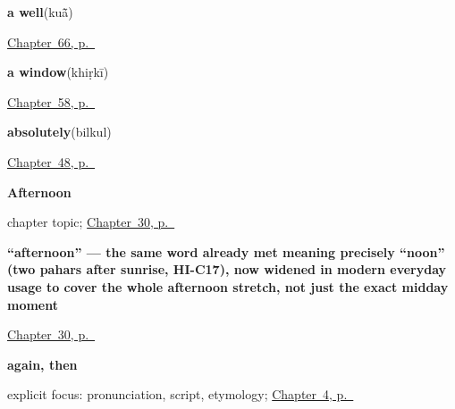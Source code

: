 \noindent\begin{minipage}[t]{\linewidth}
\raggedright
\textbf{a well}\enspace\emph{}\enspace(kuā̃)\par
\footnotesize \hyperref[ch:hi-the-field-and-the-well]{Chapter~66, p.~\pageref*{ch:hi-the-field-and-the-well}}
\end{minipage}\par\smallskip

\noindent\begin{minipage}[t]{\linewidth}
\raggedright
\textbf{a window}\enspace\emph{}\enspace(khiṛkī)\par
\footnotesize \hyperref[ch:hi-inside-the-house]{Chapter~58, p.~\pageref*{ch:hi-inside-the-house}}
\end{minipage}\par\smallskip

\noindent\begin{minipage}[t]{\linewidth}
\raggedright
\textbf{absolutely}\enspace\emph{}\enspace(bilkul)\par
\footnotesize \hyperref[ch:hi-replies]{Chapter~48, p.~\pageref*{ch:hi-replies}}
\end{minipage}\par\smallskip

\noindent\begin{minipage}[t]{\linewidth}
\raggedright
\textbf{Afternoon}\par
\footnotesize chapter topic; \hyperref[ch:hi-afternoon]{Chapter~30, p.~\pageref*{ch:hi-afternoon}}
\end{minipage}\par\smallskip

\noindent\begin{minipage}[t]{\linewidth}
\raggedright
\textbf{\textquotedblleft{}afternoon\textquotedblright{} — the same word already met meaning precisely \textquotedblleft{}noon\textquotedblright{} (two pahars after sunrise, HI-C17), now widened in modern everyday usage to cover the whole afternoon stretch, not just the exact midday moment}\enspace\emph{}\par
\footnotesize \hyperref[ch:hi-afternoon]{Chapter~30, p.~\pageref*{ch:hi-afternoon}}
\end{minipage}\par\smallskip

\noindent\begin{minipage}[t]{\linewidth}
\raggedright
\textbf{again, then}\enspace\emph{}\par
\footnotesize explicit focus: pronunciation, script, etymology; \hyperref[ch:farewells]{Chapter~4, p.~\pageref*{ch:farewells}}
\end{minipage}\par\smallskip

